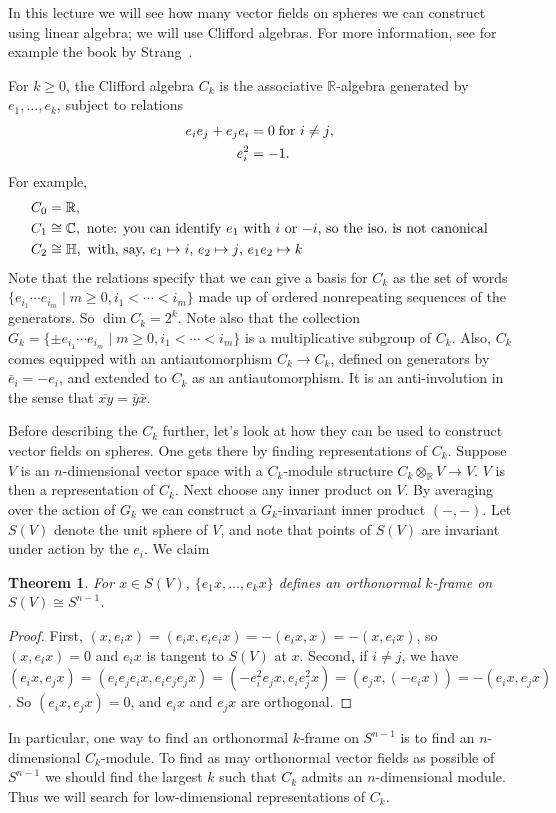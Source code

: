 \documentclass{article}
\newcommand{\C}{\mathbb{C}}
\newcommand{\R}{\mathbb{R}}
\newtheorem{thm}{Theorem}[section]
\begin{document}
In this lecture we will see how many vector fields on spheres we can construct using linear algebra; we will use Clifford algebras.  For more information, see for example the book by Strang~\cite{Strang}.

For $k \ge 0$, the Clifford algebra $C_k$ is the associative $\R$-algebra generated by $e_1, \ldots, e_k$, subject to relations
\begin{align*}
e_i e_j + e_j e_i & = 0 \hbox{\;for $i \ne j$}, \\
e_i^2 & = -1.
\end{align*}
For example,
\begin{align*}
C_0 & = \R, \\
C_1 & \cong \C, \hbox{ note: you can identify $e_1$ with $i$ or $-i$, so the iso.\ is not canonical} \\
C_2 & \cong \mathbb{H}, \hbox{ with, say, $e_1 \mapsto i$, $e_2 \mapsto j$, $e_1 e_2 \mapsto k$}
\end{align*}
Note that the relations specify that we can give a basis for $C_k$ as the set of words $\{e_{i_1} \cdots e_{i_m} \mid m \ge 0, i_1 < \cdots < i_m\}$ made up of ordered nonrepeating sequences of the generators.  So $\dim C_k = 2^k$.  Note also that the collection $G_k = \{ \pm e_{i_1} \cdots e_{i_m} \mid m \ge 0, i_1 < \cdots < i_m\}$ is a multiplicative subgroup of $C_k$.  Also, $C_k$ comes equipped with an antiautomorphism $C_k \to C_k$, defined on generators by $\bar e_i = -e_i$, and extended to $C_k$ as an antiautomorphism.  It is an anti-involution in the sense that $\overline{xy} = \bar y \bar x$.

Before describing the $C_k$ further, let's look at how they can be used to construct vector fields on spheres.  One gets there by finding representations of $C_k$. Suppose $V$ is an $n$-dimensional vector space with a $C_k$-module structure $C_k \otimes_\R V \to V$.  $V$ is then a representation of $C_k$.  Next choose any inner product on $V$.  By averaging over the action of $G_k$ we can construct a $G_k$-invariant inner product $(-, -)$.  Let $S(V)$ denote the unit sphere of $V$, and note that points of $S(V)$ are invariant under action by the $e_i$.  We claim
\begin{thm}
For $x \in S(V)$, $\{e_1 x, \ldots, e_k x\}$ defines an orthonormal $k$-frame on $S(V) \cong S^{n-1}$.
\end{thm}
\begin{proof}
First, $(x, e_i x) = (e_i x, e_i e_i x) = -(e_i x, x) = -(x, e_i x)$, so $(x, e_i x) = 0$ and $e_i x$ is tangent to $S(V)$ at $x$.  Second, if $i \ne j$, we have $(e_i x, e_j x) = (e_i e_j e_i x, e_i e_j e_j x) = (-e_i^2 e_j x, e_i e_j^2 x) = (e_j x, (-e_i x)) = -(e_i x, e_j x)$.  So $(e_i x, e_j x) = 0$, and $e_i x$ and $e_j x$ are orthogonal.
\end{proof}
In particular, one way to find an orthonormal $k$-frame on $S^{n-1}$ is to find an $n$-dimensional $C_k$-module. To find as may orthonormal vector fields as possible of $S^{n-1}$ we should find the largest $k$ such that $C_k$ admits an $n$-dimensional module.
Thus we will search for low-dimensional representations of $C_k$.
\end{document}
